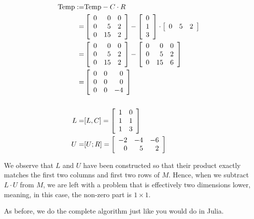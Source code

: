 \begin{align*}
    {\rm Temp} :=& {\rm Temp} - C \cdot R \\
    =& \left[ \begin{array}{rrr} 0 & 0 & 0 \\ 0 & 5 & 2 \\ 0 & 15 & 2 \end{array} \right]
    - \left[ \begin{array}{r} 0 \\ 1 \\ 3 \end{array} \right] \cdot \left[ \begin{array}{rrr} 0 & 5 & 2 \end{array} \right] \\
    =& \left[ \begin{array}{rrr} 0 & 0 & 0 \\ 0 & 5 & 2 \\ 0 & 15 & 2 \end{array} \right] - \left[ \begin{array}{rrr} 0 & 0 & 0 \\ 0 & 5 & 2 \\ 0 & 15 & 6 \end{array} \right] \\
    =& \left[ \begin{array}{rrr} 0 & 0 & 0 \\ 0 & 0 & 0 \\ 0 & 0 & -4 \end{array} \right] \\
    \\
    L =& [L, C] = \left[ \begin{array}{rr} 1 & 0 \\ 1 & 1 \\ 1 & 3 \end{array} \right] \\
    U =& [U; R] = \left[ \begin{array}{rrr} -2 & -4 & -6 \\ 0 & 5 & 2 \end{array}\right]
\end{align*}

\begin{tcolorbox}[sharp corners, colback=green!30, colframe=green!80!blue, title = \textbf{Another Reminder:} ]
We observe that $L$ and $U$ have been constructed so that their product exactly matches the first two columns and first two rows of $M$. Hence, when we subtract $L \cdot U$ from $M$, we are left with a problem that is effectively two dimensions lower, meaning, in this case, the non-zero part is $1 \times 1$. 
\end{tcolorbox}
As before, we do the complete algorithm just like you would do in Julia.\\

